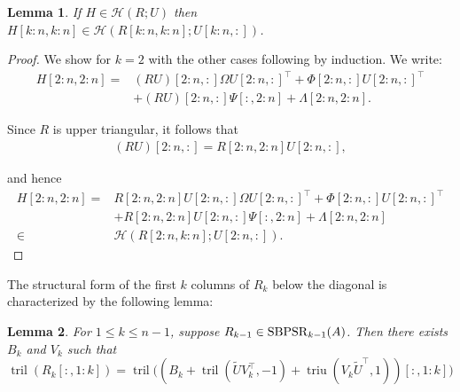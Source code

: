 \documentclass[a4paper,fleqn]{cas-sc}
\newtheorem{lemma}{Lemma}
\def\calH{{\mathcal H}}
\DeclareMathOperator{\triu}{triu}
\DeclareMathOperator{\tril}{tril}
\begin{document}
\begin{lemma}\label{Lemma:PpertubR}
    If $H \in \calH(R;U)$ then $H[k\!:\!n,k\!:\!n] \in \calH(R[k:n,k:n];U[k:n,:])$.
\end{lemma}
\begin{proof}
    We show for $k=2$ with the other cases following by induction. We write:
\begin{align*}
    H[2\!:\!n,2\!:\!n] = &(RU)[2:n,:]\Omega U[2:n,:]^\top   +
    \Phi[2:n,:]U[2:n,:]^\top \\&+ (RU)[2:n,:]\Psi[:,2:n] + \Lambda[2:n,2:n].
\end{align*}

Since $R$ is upper triangular, it follows that
\begin{align*}
    (RU)[2:n,:]=R[2:n,2:n]U[2:n,:],
\end{align*}

and hence
\begin{align*}
H[2\!:\!n,2\!:\!n] = &R[2:n,2:n]U[2:n,:]\Omega U[2:n,:]^\top   +
    \Phi[2:n,:]U[2:n,:]^\top \\&+ R[2:n,2:n]U[2:n,:]\Psi[:,2:n] + \Lambda[2:n,2:n] \\ \in &\calH(R[2:n,k:n];U[2:n,:]).
\end{align*}
\end{proof}

The structural form of the first $k$ columns of $R_k$ below the diagonal is characterized by the following lemma:

\begin{lemma} \label{lemma: RQ_lower}
    For $1\leq k \leq n-1$, suppose $R_{k-1}  \in {\rm SBPSR}_{k-1}(A)$. Then there exists $B_k$ and $V_k$ such that
\[
\tril(R_k[:,1:k]) = \tril\big( (B_k + \tril(\tilde U V_k^\top, -1) + \triu(V_k \tilde U^\top,1))[:,1:k]\big)
\]
\end{lemma}
\end{document}
